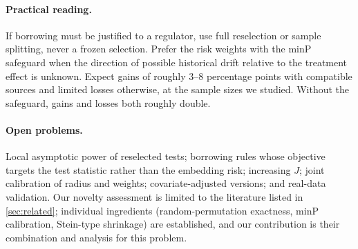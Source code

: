 \paragraph{Practical reading.} If borrowing must be justified to a regulator, use full reselection or sample splitting, never a frozen selection. Prefer the risk weights with the minP safeguard when the direction of possible historical drift relative to the treatment effect is unknown. Expect gains of roughly $3$--$8$ percentage points with compatible sources and limited losses otherwise, at the sample sizes we studied. Without the safeguard, gains and losses both roughly double.

\paragraph{Open problems.} Local asymptotic power of reselected tests; borrowing rules whose objective targets the test statistic rather than the embedding risk; increasing $J$; joint calibration of radius and weights; covariate-adjusted versions; and real-data validation. Our novelty assessment is limited to the literature listed in \cref{sec:related}; individual ingredients (random-permutation exactness, minP calibration, Stein-type shrinkage) are established, and our contribution is their combination and analysis for this problem.
